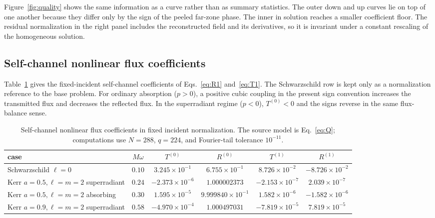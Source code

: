 \documentclass[aps,prd,twocolumn,nofootinbib,superscriptaddress,10pt,floatfix]{revtex4-2}
\begin{document}
Figure~\ref{fig:quality} shows the same information as a curve rather than as
summary statistics.  The outer down and up curves lie on top of one another
because they differ only by the sign of the peeled far-zone phase.  The inner
in solution reaches a smaller coefficient floor.  The residual normalization in
the right panel includes the reconstructed field and its derivatives, so it is
invariant under a constant rescaling of the homogeneous solution.

\subsection{Self-channel nonlinear flux coefficients}

Table~\ref{tab:flux} gives the fixed-incident self-channel coefficients of
Eqs.~\eqref{eq:R1} and~\eqref{eq:T1}.  The Schwarzschild row is kept only as a
normalization reference to the base problem.  For ordinary absorption
($p>0$), a positive cubic coupling in the present sign convention increases
the transmitted flux and decreases the reflected flux.  In the superradiant
regime ($p<0$), $T^{(0)}<0$ and the signs reverse in the same flux-balance
sense.

\begin{table}[t]
\caption{Self-channel nonlinear flux coefficients in fixed incident
normalization.  The source model is Eq.~\eqref{eq:Q}; computations use
$N=288$, $q=224$, and Fourier-tail tolerance $10^{-11}$.}
\begin{ruledtabular}
\begin{tabular}{l c c c c c}
case & $M\omega$ & $T^{(0)}$ & $R^{(0)}$ & $T^{(1)}$ & $R^{(1)}$\\
\hline
Schwarzschild $\ell=0$ & $0.10$ & $3.245\times10^{-1}$ & $6.755\times10^{-1}$
& $8.726\times10^{-2}$ & $-8.726\times10^{-2}$\\
Kerr $a=0.5,\ell=m=2$ superradiant & $0.24$ & $-2.373\times10^{-6}$
& $1.000002373$ & $-2.153\times10^{-7}$ & $2.039\times10^{-7}$\\
Kerr $a=0.5,\ell=m=2$ absorbing & $0.30$ & $1.595\times10^{-5}$
& $9.999840\times10^{-1}$ & $1.582\times10^{-6}$ & $-1.582\times10^{-6}$\\
Kerr $a=0.9,\ell=m=2$ superradiant & $0.58$ & $-4.970\times10^{-4}$
& $1.000497031$ & $-7.819\times10^{-5}$ & $7.819\times10^{-5}$\\
\end{tabular}
\end{ruledtabular}
\label{tab:flux}
\end{table}
\end{document}
